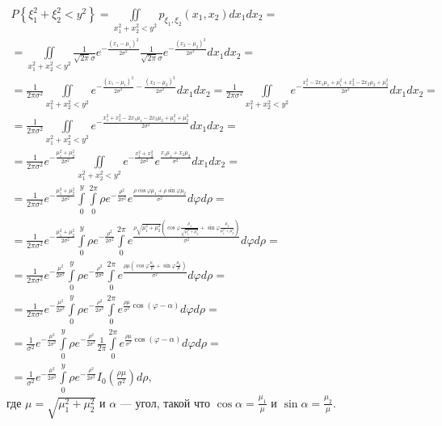 \documentclass[a4paper,12pt]{article}
\newcommand{\probability}[1]{P \left \{ #1 \right \}}
\begin{document}
    \begin{multline*}
        \probability{\xi_1^2 + \xi_2^2 < y^2}
        = \iint \limits_{x_1^2 + x_2^2 < y^2} p_{\xi_1, \xi_2} (x_1, x_2) dx_1 dx_2 = \\
        = \iint \limits_{x_1^2 + x_2^2 < y^2} \frac{1}{\sqrt{2 \pi} \sigma} e^{- \frac{(x_1 - \mu_1)^2}{2 \sigma^2}} \frac{1}{\sqrt{2 \pi} \sigma} e^{- \frac{(x_2 - \mu_2)^2}{2 \sigma^2}} dx_1 dx_2 = \\
        = \frac{1}{2 \pi \sigma^2} \iint \limits_{x_1^2 + x_2^2 < y^2} e^{- \frac{(x_1 - \mu_1)^2}{2 \sigma^2} - \frac{(x_2 - \mu_2)^2}{2 \sigma^2}} dx_1 dx_2
        = \frac{1}{2 \pi \sigma^2} \iint \limits_{x_1^2 + x_2^2 < y^2} e^{- \frac{x_1^2 - 2 x_1 \mu_1 + \mu_1^2 + x_2^2 - 2 x_2 \mu_2 + \mu_2^2}{2 \sigma^2}} dx_1 dx_2 = \\
        = \frac{1}{2 \pi \sigma^2} \iint \limits_{x_1^2 + x_2^2 < y^2} e^{- \frac{x_1^2 + x_2^2 - 2 x_1 \mu_1 - 2 x_2 \mu_2 + \mu_1^2 + \mu_2^2}{2 \sigma^2}} dx_1 dx_2 = \\
        = \frac{1}{2 \pi \sigma^2} e^{- \frac{\mu_1^2 + \mu_2^2}{2 \sigma^2}} \iint \limits_{x_1^2 + x_2^2 < y^2} e^{- \frac{x_1^2 + x_2^2}{2 \sigma^2}} e^{\frac{x_1 \mu_1 + x_2 \mu_2}{\sigma^2}} dx_1 dx_2 = \\
        = \frac{1}{2 \pi \sigma^2} e^{- \frac{\mu_1^2 + \mu_2^2}{2 \sigma^2}} \int \limits_0^y \int \limits_0^{2 \pi} \rho e^{- \frac{\rho^2}{2 \sigma^2}} e^{\frac{\rho \cos \varphi \mu_1 + \rho \sin \varphi \mu_2}{\sigma^2}} d \varphi d \rho = \\
        = \frac{1}{2 \pi \sigma^2} e^{- \frac{\mu_1^2 + \mu_2^2}{2 \sigma^2}} \int \limits_0^y \rho e^{- \frac{\rho^2}{2 \sigma^2}} \int \limits_0^{2 \pi} e^{\frac{\rho \sqrt{\mu_1^2 + \mu_2^2} \left ( \cos \varphi \frac{\mu_1}{\sqrt{\mu_1^2 + \mu_2^2}} + \sin \varphi \frac{\mu_2}{\mu_1^2 + \mu_2^2} \right ) }{\sigma^2}} d \varphi d \rho = \\
        = \frac{1}{2 \pi \sigma^2} e^{- \frac{\mu^2}{2 \sigma^2}} \int \limits_0^y \rho e^{- \frac{\rho^2}{2 \sigma^2}} \int \limits_0^{2 \pi} e^{\frac{\rho \mu \left ( \cos \varphi \frac{\mu_1}{\mu} + \sin \varphi \frac{\mu_2}{\mu} \right ) }{\sigma^2}} d \varphi d \rho = \\
        = \frac{1}{2 \pi \sigma^2} e^{- \frac{\mu^2}{2 \sigma^2}} \int \limits_0^y \rho e^{- \frac{\rho^2}{2 \sigma^2}} \int \limits_0^{2 \pi} e^{\frac{\rho \mu}{\sigma^2} \cos ( \varphi - \alpha )} d \varphi d \rho = \\
        = \frac{1}{\sigma^2} e^{- \frac{\mu^2}{2 \sigma^2}} \int \limits_0^y \rho e^{- \frac{\rho^2}{2 \sigma^2}} \frac{1}{2 \pi} \int \limits_0^{2 \pi} e^{\frac{\rho \mu}{\sigma^2} \cos ( \varphi - \alpha )} d \varphi d \rho = \\
        = \frac{1}{\sigma^2} e^{- \frac{\mu^2}{2 \sigma^2}} \int \limits_0^y \rho e^{- \frac{\rho^2}{2 \sigma^2}} I_0 \left ( \frac{\rho \mu}{\sigma^2} \right ) d \rho ,
    \end{multline*}
    где $\mu = \sqrt{\mu_1^2 + \mu_2^2}$ и $\alpha$ --- угол, такой что $\cos \alpha = \frac{\mu_1}{\mu}$ и $\sin \alpha = \frac{\mu_2}{\mu}$.
\end{document}
